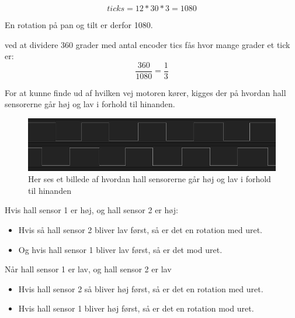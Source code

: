 \begin{equation}
ticks = 12*30*3 = 1080
\end{equation}

En rotation på pan og tilt er derfor 1080.

ved at dividere 360 grader med antal encoder tics fås hvor mange grader et tick er:
\begin{equation}
\frac{360}{1080} = \frac{1}{3}
\end{equation}

For at kunne finde ud af hvilken vej motoren kører, kigges der på hvordan hall sensorerne går høj og lav i forhold til hinanden.



\begin{figure}[ht]
	\begin{center}
		\includegraphics[scale=0.5]{Billeder/Hall_sensorer.png}
	\end{center}
\label{fig:Hall_Sensorer}
\caption{Her ses et billede af hvordan hall sensorerne går høj og lav i forhold til hinanden}
\end{figure}

Hvis hall sensor 1 er høj, og hall sensor 2 er høj:\\
	\begin{itemize}
	\item Hvis så hall sensor 2 bliver lav først, så er det en rotation med uret.\\
	\item Og hvis hall sensor 1 bliver lav først, så er det mod uret.\\
	\end{itemize}

Når hall sensor 1 er lav, og hall sensor 2 er lav\\
	\begin{itemize}
\item Hvis hall sensor 2 så bliver høj først, så er det en rotation med uret.\\
	\item Hvis hall sensor 1 bliver høj først, så er det en rotation mod uret.\\
	\end{itemize}





